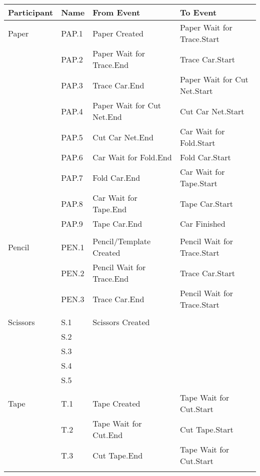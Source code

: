 \begin{longtable}{p{2.4cm}>{\raggedright\arraybackslash}p{1.2cm}>{\raggedright\arraybackslash}p{5.9cm}>{\raggedright\arraybackslash}p{5.9cm}}
\toprule
Participant & Name & From Event & To Event       \\ \midrule
\endhead
Paper & PAP.1 & Paper Created & Paper Wait for Trace.Start \\
      & PAP.2 & Paper Wait for Trace.End & Trace Car.Start \\
      & PAP.3 & Trace Car.End & Paper Wait for Cut Net.Start \\
      & PAP.4 & Paper Wait for Cut Net.End & Cut Car Net.Start \\
      & PAP.5 & Cut Car Net.End & Car Wait for Fold.Start \\
      & PAP.6 & Car Wait for Fold.End & Fold Car.Start \\
      & PAP.7 & Fold Car.End & Car Wait for Tape.Start \\
      & PAP.8 & Car Wait for Tape.End & Tape Car.Start \\
      & PAP.9 & Tape Car.End & Car Finished \\
      &      &              &              \\
Pencil & PEN.1 & Pencil/Template Created & Pencil Wait for Trace.Start \\
       & PEN.2 & Pencil Wait for Trace.End & Trace Car.Start \\
       & PEN.3 & Trace Car.End & Pencil Wait for Trace.Start \\
       &      &              &              \\
Scissors & S.1 & Scissors Created             &              \\
       & S.2   &              &              \\
       & S.3   &              &              \\
       & S.4   &              &              \\
       & S.5   &              &              \\
       &      &              &              \\
Tape   & T.1 & Tape Created & Tape Wait for Cut.Start \\
       & T.2 & Tape Wait for Cut.End & Cut Tape.Start \\
       & T.3 & Cut Tape.End & Tape Wait for Cut.Start \\
       &      &              &              \\

\end{longtable}

